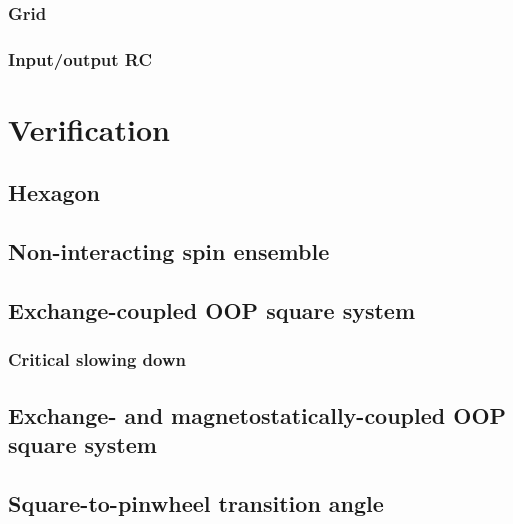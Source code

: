 \subsubsection{Grid}
\subsubsection{Input/output RC}

\section{Verification} %
\subsection{Hexagon}
\subsection{Non-interacting spin ensemble}
\subsection{Exchange-coupled OOP square system}
\subsubsection{Critical slowing down}
\subsection{Exchange- and magnetostatically-coupled OOP square system}
\subsection{Square-to-pinwheel transition angle}
